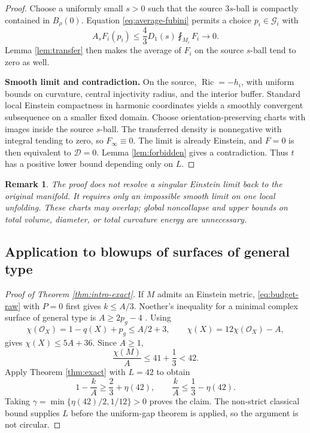 \documentclass[a4paper,11pt]{article}
\theoremstyle{paper}
\newtheorem{remark}[theorem]{Remark}
\DeclareMathOperator{\Ric}{Ric}
\newcommand{\av}{\fint}
\newcommand{\Dcal}{\mathcal D}
\numberwithin{equation}{section}
\begin{document}
\begin{proof}
Choose a uniformly small $s>0$ such that the source $3s$-ball is compactly contained in $B_\rho(0)$. Equation \eqref{eq:average-fubini} permits a choice $p_i\in\mathcal G_i$ with
\[
A_sF_i(p_i)\le\frac43D_1(s)\av_{M_i}F_i\longrightarrow0.
\]
Lemma \ref{lem:transfer} then makes the average of $F_i$ on the source $s$-ball tend to zero as well.

\textbf{Smooth limit and contradiction.}
On the source, $\Ric=-h_i$, with uniform bounds on curvature, central injectivity radius, and the interior buffer. Standard local Einstein compactness in harmonic coordinates yields a smoothly convergent subsequence on a smaller fixed domain. Choose orientation-preserving charts with images inside the source $s$-ball. The transferred density is nonnegative with integral tending to zero, so $F_\infty\equiv0$. The limit is already Einstein, and $F=0$ is then equivalent to $\Dcal=0$. Lemma \ref{lem:forbidden} gives a contradiction. Thus $t$ has a positive lower bound depending only on $L$.
\end{proof}

\begin{remark}
The proof does not resolve a singular Einstein limit back to the original manifold. It requires only an impossible smooth limit on one local unfolding. These charts may overlap; global noncollapse and upper bounds on total volume, diameter, or total curvature energy are unnecessary.
\end{remark}

\subsection{Application to blowups of surfaces of general type}

\begin{proof}[Proof of Theorem \ref{thm:intro-exact}]
If $M$ admits an Einstein metric, \eqref{eq:budget-raw} with $P=0$ first gives $k\le A/3$. Noether's inequality for a minimal complex surface of general type is $A\ge2p_g-4$ \cite{liedtke}. Using
\[
\chi(\mathcal O_X)=1-q(X)+p_g\le A/2+3,
\qquad \chi(X)=12\chi(\mathcal O_X)-A,
\]
gives $\chi(X)\le5A+36$. Since $A\ge1$,
\[
\frac{\chi(M)}A\le41+\frac13<42.
\]
Apply Theorem \ref{thm:exact} with $L=42$ to obtain
\[
1-\frac{k}{A}\ge\frac23+\eta(42),\qquad
\frac{k}{A}\le\frac13-\eta(42).
\]
Taking $\gamma=\min\{\eta(42)/2,1/12\}>0$ proves the claim. The non-strict classical bound supplies $L$ before the uniform-gap theorem is applied, so the argument is not circular.
\end{proof}
\end{document}
